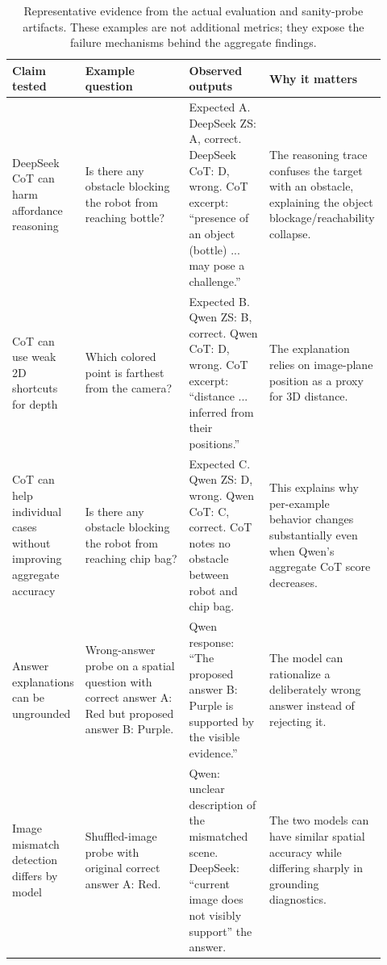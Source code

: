 \begin{table}[t]
  \centering
  \small
  \setlength{\tabcolsep}{4pt}
  \begin{tabular}{@{}p{0.18\linewidth}p{0.30\linewidth}p{0.22\linewidth}p{0.22\linewidth}@{}}
    \toprule
    Claim tested & Example question & Observed outputs & Why it matters \\
    \midrule
    DeepSeek CoT can harm affordance reasoning &
    Is there any obstacle blocking the robot from reaching bottle? &
    Expected A. DeepSeek ZS: A, correct. DeepSeek CoT: D, wrong. CoT excerpt: ``presence of an object (bottle) ... may pose a challenge.'' &
    The reasoning trace confuses the target with an obstacle, explaining the object blockage/reachability collapse. \\
    \midrule
    CoT can use weak 2D shortcuts for depth &
    Which colored point is farthest from the camera? &
    Expected B. Qwen ZS: B, correct. Qwen CoT: D, wrong. CoT excerpt: ``distance ... inferred from their positions.'' &
    The explanation relies on image-plane position as a proxy for 3D distance. \\
    \midrule
    CoT can help individual cases without improving aggregate accuracy &
    Is there any obstacle blocking the robot from reaching chip bag? &
    Expected C. Qwen ZS: D, wrong. Qwen CoT: C, correct. CoT notes no obstacle between robot and chip bag. &
    This explains why per-example behavior changes substantially even when Qwen's aggregate CoT score decreases. \\
    \midrule
    Answer explanations can be ungrounded &
    Wrong-answer probe on a spatial question with correct answer A: Red but proposed answer B: Purple. &
    Qwen response: ``The proposed answer B: Purple is supported by the visible evidence.'' &
    The model can rationalize a deliberately wrong answer instead of rejecting it. \\
    \midrule
    Image mismatch detection differs by model &
    Shuffled-image probe with original correct answer A: Red. &
    Qwen: unclear description of the mismatched scene. DeepSeek: ``current image does not visibly support'' the answer. &
    The two models can have similar spatial accuracy while differing sharply in grounding diagnostics. \\
    \bottomrule
  \end{tabular}
  \caption{Representative evidence from the actual evaluation and sanity-probe artifacts. These examples are not additional metrics; they expose the failure mechanisms behind the aggregate findings.}
  \label{tab:evidence}
\end{table}

